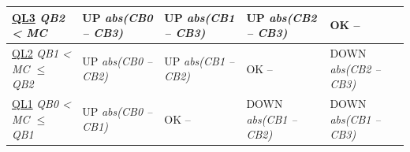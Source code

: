 \begin{minipage}{\linewidth}
\begin{tabularx}
  {\textwidth}
  { X | X | X | X | X }
  \toprule
      \centering \hspace{4mm} \uline{QL3} \newline \footnotesize \textit{QB2 \textless{} MC} 
    & \centering \hspace{4mm} UP \newline \footnotesize \textit{abs(CB0 -- CB3)} 
    & \centering \hspace{4mm} UP \newline \footnotesize \textit{abs(CB1 -- CB3)} 
    & \centering \hspace{4mm} UP \newline \footnotesize \textit{abs(CB2 -- CB3)} 
    & \centering \hspace{4mm} OK \newline -- 
    \tabularnewline
  \hline
      \centering \hspace{4mm} \uline{QL2} \newline \footnotesize \textit{QB1 \textless{} MC $\leq$ QB2} 
    & \centering \hspace{4mm} UP \newline \footnotesize \textit{abs(CB0 -- CB2)} 
    & \centering \hspace{4mm} UP \newline \footnotesize \textit{abs(CB1 -- CB2)} 
    & \centering \hspace{4mm} OK \newline -- 
    & \centering \hspace{4mm} DOWN \newline \footnotesize \textit{abs(CB2 -- CB3)} 
    \tabularnewline
  \hline
      \centering \hspace{4mm} \uline{QL1} \newline \footnotesize \textit{QB0 \textless{} MC $\leq$ QB1} 
    & \centering \hspace{4mm} UP \newline \footnotesize \textit{abs(CB0 -- CB1)} 
    & \centering \hspace{4mm} OK \newline -- 
    & \centering \hspace{4mm} DOWN \newline \footnotesize \textit{abs(CB1 -- CB2)} 
    & \centering \hspace{4mm} DOWN \newline \footnotesize \textit{abs(CB1 -- CB3)} 

\end{tabularx}
\end{minipage}
